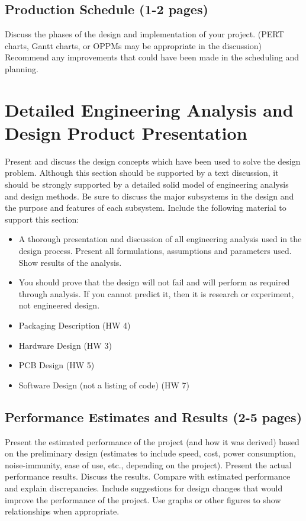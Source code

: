 \documentclass[12pt]{article}
\begin{document}
\subsection{Production Schedule (1-2 pages)}
Discuss the phases of the design and implementation of your project. (PERT charts, Gantt charts, or OPPMs may be appropriate in the discussion) Recommend any improvements that could have been made in the scheduling and planning.

\section{Detailed Engineering Analysis and Design Product Presentation}
Present and discuss the design concepts which have been used to solve the design problem. Although this section should be supported by a text discussion, it should be strongly supported by a detailed solid model of engineering analysis and design methods. Be sure to discuss the major subsystems in the design and the purpose and features of each subsystem. Include the following material to support this section:
\begin{itemize}[noitemsep]
    \item A thorough presentation and discussion of all engineering analysis used in the design process. Present all formulations, assumptions and parameters used. Show results of the analysis.
    \item You should prove that the design will not fail and will perform as required through analysis. If you cannot predict it, then it is research or experiment, not engineered design.
    \item Packaging Description (HW 4)
    \item Hardware Design (HW 3)
    \item PCB Design (HW 5)
    \item Software Design (not a listing of code) (HW 7)
\end{itemize}

\subsection{Performance Estimates and Results (2-5 pages)}
Present the estimated performance of the project (and how it was derived) based on the preliminary design (estimates to include speed, cost, power consumption, noise-immunity, ease of use, etc., depending on the project). Present the actual performance results. Discuss the results. Compare with estimated performance and explain discrepancies. Include suggestions for design changes that would improve the performance of the project. Use graphs or other figures to show relationships when appropriate.
\end{document}

